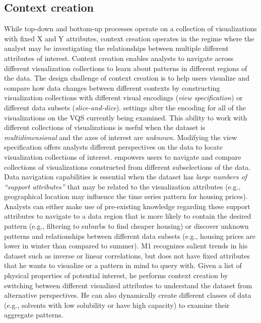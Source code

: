    \subsection{Context creation}
   While top-down and bottom-up processes operate on a collection of visualizations with fixed X and Y attributes, context creation operates in the regime where the analyst may be investigating the relationships between multiple different attributes of interest. Context creation enables analysts to navigate across different visualization collections to learn about patterns in different regions of the data. The design challenge of context creation is to help users visualize and compare how data changes between  different contexts by constructing visualization collections with different visual encodings (\textit{view specification}) or different data subsets (\textit{slice-and-dice}).%
    settings alter the encoding for all of the visualizations on the VQS currently being examined. This ability to work with different collections of visualizations is useful when the dataset is \emph{multidimensional} and the axes of interest are \emph{unknown}. Modifying the view specification offers analysts different perspectives on the data to locate visualization collections of interest.
    empowers users to navigate and compare collections of visualizations constructed from different subselections of the data. Data navigation capabilities is essential when the dataset has \emph{large numbers of ``support attributes''} that may be related to the visualization attributes (e.g., geographical location may influence the time series pattern for housing prices). Analysts can either make use of pre-existing knowledge regarding these support attributes to navigate to a data region that is more likely to contain the desired pattern (e.g., filtering to suburbs to find cheaper housing) or discover unknown patterns and relationships between different data subsets (e.g., housing prices are lower in winter than compared to summer).%
    M1 recognizes salient trends in his dataset such as inverse or linear correlations, but does not have fixed attributes that he wants to visualize or a pattern in mind to query with. Given a list of physical properties of potential interest, he performs context creation by switching between different visualized attributes to understand the dataset from alternative perspectives. He can also dynamically create different classes of data (e.g., solvents with low solubility or have high capacity) to examine their aggregate patterns.
